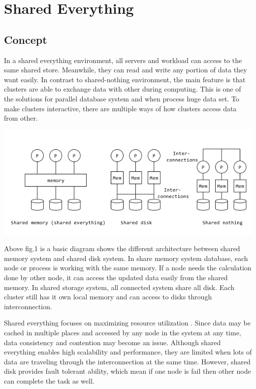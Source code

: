\documentclass[onecolumn, draftclsnofoot,10pt, compsoc]{IEEEtran}
\begin{document}
	\newpage
	\tableofcontents
	\clearpage
	
	\section{Shared Everything}

    \subsection{Concept}
In a shared everything environment, all servers and workload can access to the same shared store.
Meanwhile, they can read and write any portion of data they want easily.
In contrast to shared-nothing environment, the main feature is that clusters are able to exchange data with other during computing.
This is one of the solutions for parallel database system and when process huge data set. 
To make clusters interactive, there are multiple ways of how clusters access data from other.

\includegraphics{amyImage1}

Above fig.1 is a basic diagram shows the different architecture between shared memory system and shared disk system. 
In share memory system database, each node or process is working with the same memory. 
If a node needs the calculation done by other node, it can access the updated data easily from the shared memory. 
In shared storage system, all connected system share all disk. 
Each cluster still has it own local memory and can access to disks through interconnection.

Shared everything focuses on maximizing resource utilization \cite{ClaussenBestofBoth}. 
Since data may be cached in multiple places and accessed by any node in the system at any time, data consistency and contention may become an issue.
Although shared everything enables high scalability and performance, they are limited when lots of data are traveling through the interconnection at the same time. 
However, shared disk provides fault tolerant ability, which mean if one node is fail then other node can complete the task as well.  
\end{document}
